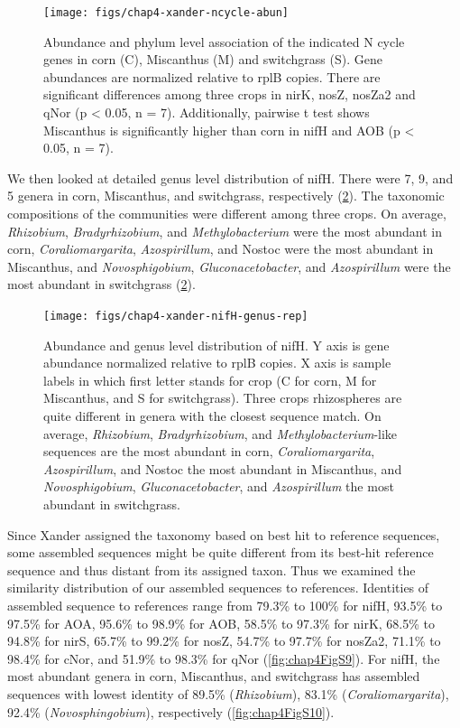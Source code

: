 \documentclass[]{msu-thesis}
\begin{document}
\begin{figure}[tbph!]
  \centering
  \texttt{[image: figs/chap4-xander-ncycle-abun]}
  \caption[Abundance and phylum association of the indicated N cycle genes]{Abundance and phylum level association of the indicated N cycle genes in corn (C), Miscanthus (M) and switchgrass (S). Gene abundances are normalized relative to rplB copies. There are significant differences among three crops in nirK, nosZ, nosZa2 and qNor (p < 0.05, n = 7). Additionally, pairwise t test shows Miscanthus is significantly higher than corn in nifH and AOB (p < 0.05, n = 7).}
  \label{fig:chap4Fig4}
\end{figure}


We then looked at detailed genus level distribution of nifH. There were 7, 9, and 5 genera in corn, Miscanthus, and switchgrass, respectively (\cref{fig:chap4Fig6}). The taxonomic compositions of the communities were different among three crops. On average, \textit{Rhizobium}, \textit{Bradyrhizobium}, and \textit{Methylobacterium} were the most abundant in corn, \textit{Coraliomargarita}, \textit{Azospirillum}, and Nostoc were the most abundant in Miscanthus, and \textit{Novosphigobium}, \textit{Gluconacetobacter}, and \textit{Azospirillum} were the most abundant in switchgrass (\cref{fig:chap4Fig6}).


\begin{figure}[tbph!]
  \centering
  \texttt{[image: figs/chap4-xander-nifH-genus-rep]}
  \caption[Abundance and genus level distribution of nifH]{Abundance and genus level distribution of nifH. Y axis is gene abundance normalized relative to rplB copies. X axis is sample labels in which first letter stands for crop (C for corn, M for Miscanthus, and S for switchgrass). Three crops rhizospheres are quite different in genera with the closest sequence match. On average, \textit{Rhizobium}, \textit{Bradyrhizobium}, and \textit{Methylobacterium}-like sequences are the most abundant in corn, \textit{Coraliomargarita}, \textit{Azospirillum}, and Nostoc the most abundant in Miscanthus, and \textit{Novosphigobium}, \textit{Gluconacetobacter}, and \textit{Azospirillum} the most abundant in switchgrass.}
  \label{fig:chap4Fig6}
\end{figure}


Since Xander assigned the taxonomy based on best hit to reference sequences, some assembled sequences might be quite different from its best-hit reference sequence and thus distant from its assigned taxon. Thus we examined the similarity distribution of our assembled sequences to references. Identities of assembled sequence to references range from 79.3\% to 100\% for nifH, 93.5\% to 97.5\% for AOA, 95.6\% to 98.9\% for AOB, 58.5\% to 97.3\% for nirK, 68.5\% to 94.8\% for nirS, 65.7\% to 99.2\% for nosZ, 54.7\% to 97.7\% for nosZa2, 71.1\% to 98.4\% for cNor, and 51.9\% to 98.3\% for qNor (\cref{fig:chap4FigS9}). For nifH, the most abundant genera in corn, Miscanthus, and switchgrass has assembled sequences with lowest identity of 89.5\% (\textit{Rhizobium}), 83.1\% (\textit{Coraliomargarita}), 92.4\% (\textit{Novosphingobium}), respectively (\cref{fig:chap4FigS10}).
\end{document}
